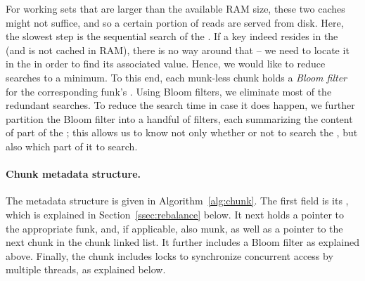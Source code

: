 For working sets that are  larger than the available RAM size, these two caches might not suffice, and so a certain portion of reads are served from disk. Here, the slowest step is the sequential search of the . 
If a key indeed resides in the 
 (and is not cached in RAM), there is no way around that -- we need to locate it in the  in order to find 
its associated value. Hence, we would like to reduce  searches to a minimum. 
To this end, each munk-less chunk holds a \emph{Bloom filter} for the corresponding funk's .
Using Bloom filters, we eliminate most of the redundant   searches.
To reduce the  search time in case it does happen, 
we further  partition the Bloom filter into a  handful of filters, each summarizing the 
content of part of the ; this allows us to know not only whether or not to search the 
, but also which part of it to search.  
 



\paragraph{Chunk metadata structure.}

The metadata structure is given in Algorithm~\ref{alg:chunk}. 
The first field is its , which is explained in Section~\ref{ssec:rebalance}  below. 
It next holds a pointer to the appropriate funk, and, if applicable, also munk, as well as a pointer to the next 
chunk in the chunk linked list.
It further includes a Bloom filter as explained above.
Finally, the chunk includes locks to synchronize concurrent access by multiple threads, as explained below.


